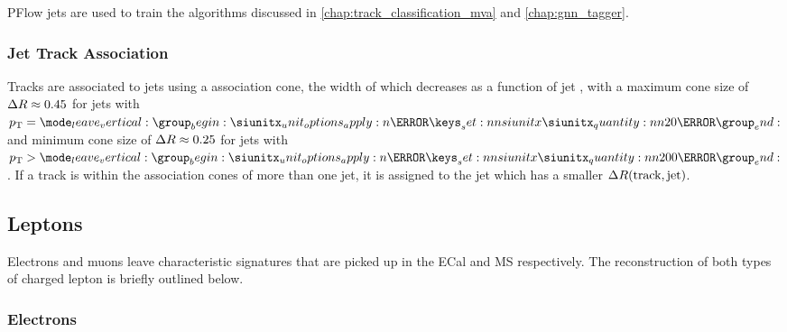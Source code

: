 PFlow jets are used to train the algorithms discussed in \cref{chap:track_classification_mva} and \cref{chap:gnn_tagger}.

\subsubsection{Jet Track Association}
Tracks are associated to \smallR jets using a \DeltaR association cone, the width of which decreases as a function of jet \pt, with a maximum cone size of $\Delta R \approx 0.45$ for jets with $\pt = \SI{20}{\GeV}$ and minimum cone size of $\Delta R \approx 0.25$ for jets with $\pt > \SI{200}{\GeV}$. 
If a track is within the association cones of more than one jet, it is assigned to the jet which has a smaller $\Delta R(\text{track}, \text{jet})$.


\subsection{Leptons}\label{sec:lepton_reco}

Electrons and muons leave characteristic signatures that are picked up in the ECal and MS respectively.
The reconstruction of both types of charged lepton is briefly outlined below.

\subsubsection{Electrons}

